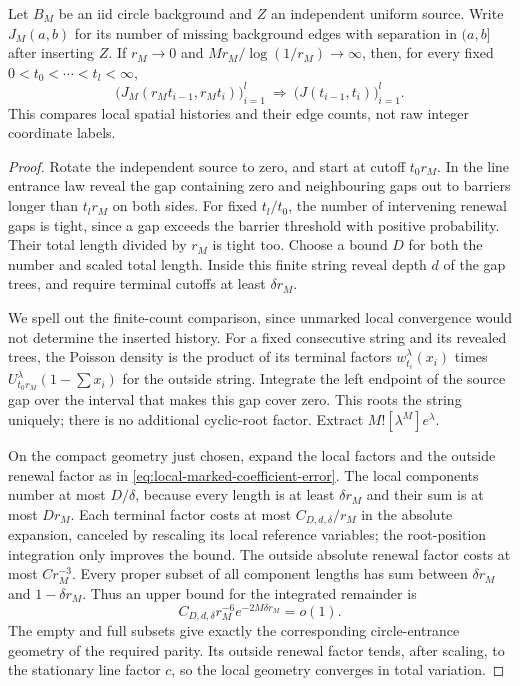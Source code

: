 \documentclass[11pt,letterpaper]{article}
\begin{document}
\begin{lemma}
\label{lem:local-history-band}
Let $B_M$ be an iid circle background and $Z$ an independent uniform
source. Write $J_M(a,b)$ for its number of missing background edges
with separation in $(a,b]$ after inserting $Z$.
If $r_M\to0$ and $Mr_M/\log(1/r_M)\to\infty$, then, for every
fixed $0<t_0<\cdots<t_l<\infty$,
\begin{equation}\label{eq:local-history-band}
 \bigl(J_M(r_Mt_{i-1},r_Mt_i)\bigr)_{i=1}^l
       \ \Longrightarrow\ \bigl(J(t_{i-1},t_i)\bigr)_{i=1}^l.
\end{equation}
This compares local spatial histories and their edge counts, not
raw integer coordinate labels.
\end{lemma}
\begin{proof}
Rotate the independent source to zero, and start at cutoff
$t_0r_M$. In the line entrance law reveal the gap containing zero
and neighbouring gaps out to barriers longer than $t_lr_M$ on
both sides. For fixed $t_l/t_0$, the number of intervening renewal
gaps is tight, since a gap exceeds the barrier threshold with
positive probability. Their total length divided by $r_M$ is tight
too. Choose a bound $D$ for both the number and scaled total length.
Inside this finite string reveal depth $d$ of the gap trees, and
require terminal cutoffs at least $\delta r_M$.

We spell out the finite-count comparison, since unmarked local
convergence would not determine the inserted history. For a fixed
consecutive string and its revealed trees, the Poisson density is
the product of its terminal factors $w_{t_i}^\lambda(x_i)$ times
$U_{t_0r_M}^\lambda(1-\sum x_i)$ for the outside string.
Integrate the left endpoint of the source gap over the interval
that makes this gap cover zero. This roots the string uniquely;
there is no additional cyclic-root factor. Extract
$M![\lambda^M]e^\lambda$.

On the compact geometry just chosen, expand the local factors and
the outside renewal factor as in
\eqref{eq:local-marked-coefficient-error}. The local components
number at most $D/\delta$, because every length is at least
$\delta r_M$ and their sum is at most $Dr_M$.
Each terminal factor costs at most $C_{D,d,\delta}/r_M$ in the
absolute expansion, canceled by rescaling its local reference
variables; the root-position integration only improves the bound.
The outside absolute renewal factor costs at most $C r_M^{-3}$.
Every proper subset of all component lengths has sum between
$\delta r_M$ and $1-\delta r_M$. Thus an upper bound for the
integrated remainder is
\[
 C_{D,d,\delta}r_M^{-6}e^{-2M\delta r_M}=o(1).
\]
The empty and full subsets give exactly the corresponding
circle-entrance geometry of the required parity. Its outside
renewal factor tends, after scaling, to the stationary line factor
$c$, so the local geometry converges in total variation.


\end{proof}
\end{document}
